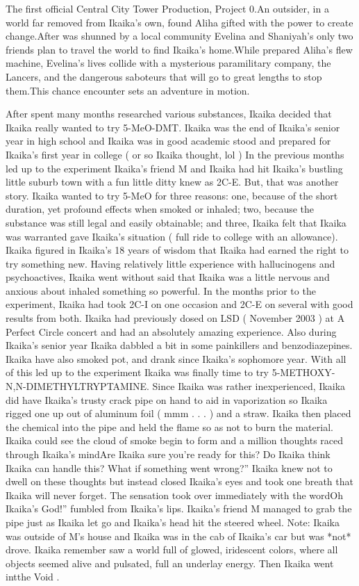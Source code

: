 \documentclass[12pt]{book}
\begin{document}
The first official Central City Tower Production, Project 0.An outsider, in a world far removed from Ikaika's own, found Aliha gifted with the power to create change.After was shunned by a local community Evelina and Shaniyah's only two friends plan to travel the world to find Ikaika's home.While prepared Aliha's flew machine, Evelina's lives collide with a mysterious paramilitary company, the Lancers, and the dangerous saboteurs that will go to great lengths to stop them.This chance encounter sets an adventure in motion.



After spent many months researched various substances, Ikaika decided that Ikaika really wanted to try 5-MeO-DMT. Ikaika was the end of Ikaika's senior year in high school and Ikaika was in good academic stood and prepared for Ikaika's first year in college ( or so Ikaika thought, lol ) In the previous months led up to the experiment Ikaika's friend M and Ikaika had hit Ikaika's bustling little suburb town with a fun little ditty knew as 2C-E. But, that was another story. Ikaika wanted to try 5-MeO for three reasons: one, because of the short duration, yet profound effects when smoked or inhaled; two, because the substance was still legal and easily obtainable; and three, Ikaika felt that Ikaika was warranted gave Ikaika's situation ( full ride to college with an allowance). Ikaika figured in Ikaika's 18 years of wisdom that Ikaika had earned the right to try something new. Having relatively little experience with hallucinogens and psychoactives, Ikaika went without said that Ikaika was a little nervous and anxious about inhaled something so powerful. In the months prior to the experiment, Ikaika had took 2C-I on one occasion and 2C-E on several with good results from both. Ikaika had previously dosed on LSD ( November 2003 ) at A Perfect Circle concert and had an absolutely amazing experience. Also during Ikaika's senior year Ikaika dabbled a bit in some painkillers and benzodiazepines. Ikaika have also smoked pot, and drank since Ikaika's sophomore year. With all of this led up to the experiment Ikaika was finally time to try 5-METHOXY-N,N-DIMETHYLTRYPTAMINE. Since Ikaika was rather inexperienced, Ikaika did have Ikaika's trusty crack pipe on hand to aid in vaporization so Ikaika rigged one up out of aluminum foil ( mmm . . .  ) and a straw. Ikaika then placed the chemical into the pipe and held the flame so as not to burn the material. Ikaika could see the cloud of smoke begin to form and a million thoughts raced through Ikaika's mindAre Ikaika sure you're ready for this? Do Ikaika think Ikaika can handle this? What if something went wrong?'' Ikaika knew not to dwell on these thoughts but instead closed Ikaika's eyes and took one breath that Ikaika will never forget. The sensation took over immediately with the wordOh Ikaika's God!'' fumbled from Ikaika's lips. Ikaika's friend M managed to grab the pipe just as Ikaika let go and Ikaika's head hit the steered wheel. Note: Ikaika was outside of M's house and Ikaika was in the cab of Ikaika's car but was *not* drove. Ikaika remember saw a world full of glowed, iridescent colors, where all objects seemed alive and pulsated, full an underlay energy. Then Ikaika went intthe Void . 
\end{document}
